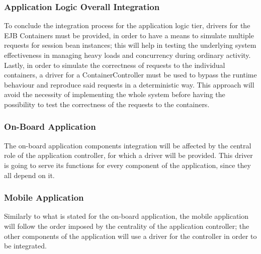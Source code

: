 \subsubsection{Application Logic Overall Integration}
To conclude the integration process for the application logic tier, drivers for the EJB Containers must be provided, in order to have a means to simulate multiple requests for session bean instances; this will help in testing the underlying system effectiveness in managing heavy loads and concurrency during ordinary activity.
\noindent
Lastly, in order to simulate the correctness of requests to the individual containers, a driver for a ContainerController must be used to bypass the runtime behaviour and reproduce said requests in a deterministic way. This approach will avoid the necessity of implementing the whole system before having the possibility to test the correctness of the requests to the containers.

\subsubsection{On-Board Application}
The on-board application components integration will be affected by the central role of the application controller, for which a driver will be provided. This driver is going to serve its functions for every component of the application, since they all depend on it.

\subsubsection{Mobile Application}
Similarly to what is stated for the on-board application, the mobile application will follow the order imposed by the centrality of the application controller; the other components of the application will use a driver for the controller in order to be integrated.


